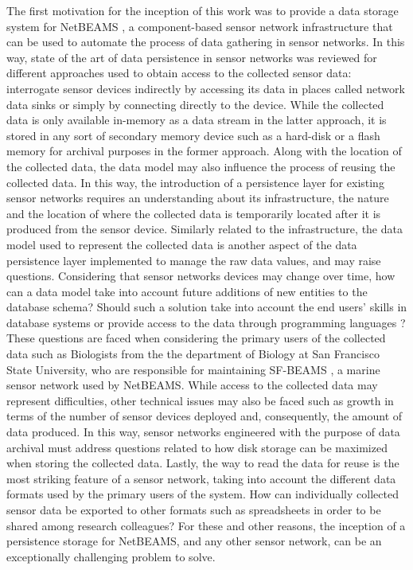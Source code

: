 The first motivation for the inception of this work was to provide a data
storage system for NetBEAMS \cite{netbeams2009}, a component-based sensor
network infrastructure that can be used to automate the process of data
gathering in sensor networks. In this way, state of the
art of data persistence in sensor networks was reviewed for different approaches used to obtain access to the
collected sensor data: interrogate sensor devices indirectly by accessing its
data in places called network data sinks or simply by connecting directly to the
device. While the collected data is only available in-memory as a data stream
in the latter approach, it is stored in any sort of secondary memory
device such as a hard-disk or a flash memory for archival purposes in the
former approach. Along with the location of the collected data, the data model 
may also influence the process of reusing the collected data. In this way,
the introduction of a persistence layer for existing sensor networks requires
an understanding about its infrastructure, the nature and the location of where the
collected data is temporarily located after it is produced from the sensor
device. Similarly related to the infrastructure, the data model used to
represent the collected data is another aspect of the data persistence layer
implemented to manage the raw data values, and may raise questions. Considering
that sensor networks devices may change over time, how can a data model take
into account future additions of new entities to the database schema? Should 
such a solution take into account the end users' skills in database systems or
provide access to the data through programming languages
\cite{sn-programming-language}? These questions are faced when 
considering the primary users of the collected data such as Biologists from the
the department of Biology at San Francisco State University, who are
responsible for maintaining SF-BEAMS \cite{sfbeams2006}, a marine sensor network
used by NetBEAMS. While access to the collected data may represent
difficulties, other technical issues may also be faced such as growth in terms
of the number of sensor devices deployed and, consequently, the amount of data
produced. In this way, sensor networks engineered with the purpose of data
archival must address questions related to how disk storage can be maximized
when storing the collected data. Lastly, the way to read the data
for reuse is the most striking feature of a sensor network, taking into
account the different data formats used by the primary users of the system.
How can individually collected sensor data be exported to other formats such as
spreadsheets in order to be shared among research colleagues? For these and
other reasons, the inception of a persistence storage for NetBEAMS, and any
other sensor network, can be an exceptionally challenging problem to solve.

